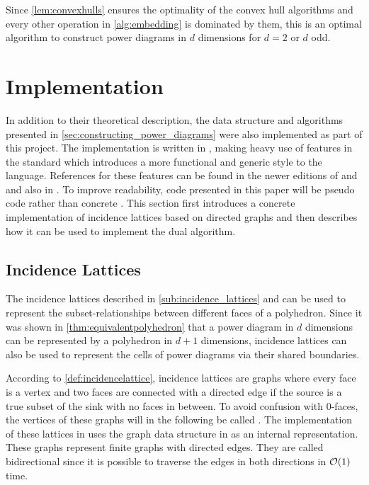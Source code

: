 Since \cref{lem:convexhulls} ensures the optimality of the convex hull algorithms and every other operation in \cref{alg:embedding} is dominated by them, this is an optimal algorithm to construct power diagrams in $d$ dimensions for $d = 2$ or $d$ odd.

\section{Implementation}
\label{sec:implementation}
In addition to their theoretical description, the data structure and algorithms presented in \cref{sec:constructing_power_diagrams} were also implemented as part of this project.
The implementation is written in \CC, making heavy use of features in the \CCe standard which introduces a more functional and generic style to the language.
References for these features can be found in the newer editions of \cite{stroustrup1986c++} and \cite{stroustrup2014programming} and also in \cite{meyers2014effective}.
To improve readability, code presented in this paper will be pseudo code rather than concrete \CC.
This section first introduces a concrete implementation of incidence lattices based on directed graphs and then describes how it can be used to implement the dual algorithm.

\subsection{Incidence Lattices}
\label{sub:impl_incidence_lattices}
The incidence lattices described in \cref{sub:incidence_lattices} and \cite{edelsbrunner1986constructing} can be used to represent the subset-relationships between different faces of a polyhedron.
Since it was shown in \cref{thm:equivalentpolyhedron} that a power diagram in $d$ dimensions can be represented by a polyhedron in $d+1$ dimensions, incidence lattices can also be used to represent the cells of power diagrams via their shared boundaries.

According to \cref{def:incidencelattice}, incidence lattices are graphs where every face is a vertex and two faces are connected with a directed edge if the source is a true subset of the sink with no faces in between.
To avoid confusion with $0$-faces, the vertices of these graphs will in the following be called .
The implementation of these lattices in  uses the graph data structure in  as an internal representation.
These graphs represent finite graphs with directed edges.
They are called bidirectional since it is possible to traverse the edges in both directions in $\mathcal{O}(1)$ time.

